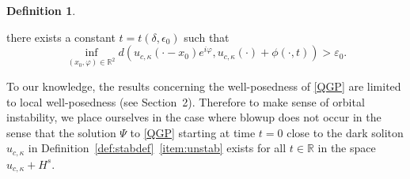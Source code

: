 \documentclass[11pt]{article}
\newcommand{\R}{\mathbb{R}}
\theoremstyle{plain}
\theoremstyle{definition}
\newtheorem{definition}[theorem]{Definition}
\theoremstyle{remark}
\numberwithin{equation}{section}
\begin{document}
{\begin{definition}
\begin{enumerate}
			there exists a constant $t=t(\delta,\epsilon_0)$ such that 
			\begin{equation}
				\inf_{(x_0,\varphi)\in\R^2}d(u_{c,\kappa}(\cdot-x_0)e^{i\varphi},u_{c,\kappa}(\cdot)+\phi(\cdot,t))>\varepsilon_0.
			\end{equation}
		\end{enumerate}
	\end{definition}
	To our knowledge, the results concerning the well-posedness of \eqref{QGP} are limited to local well-posedness (see Section~2). Therefore to make sense of orbital instability, we place ourselves in the case where blowup does not occur in the sense that the solution $\Psi$ to \eqref{QGP} starting at time $t=0$ close to the dark soliton $u_{c,\kappa}$ in Definition~\ref{def:stabdef}~\eqref{item:unstab} exists for all $t\in\R$ in the space $u_{c,\kappa}+ H^{s}$.
	
}
\end{document}
